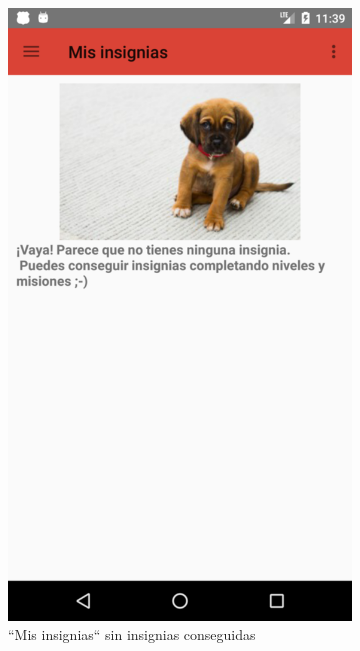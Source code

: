 \documentclass[twoside]{report}
\begin{document}
\begin{figure}[H]
\begin{center}
	\begin{subfigure}[t]{.3\linewidth}
		\includegraphics[scale=0.2]{images/userguide/7.png}
		\caption{“Mis insignias“ sin insignias conseguidas}
	\end{subfigure}\hspace{5mm}%
	\begin{subfigure}[t]{.3\linewidth}

\end{subfigure}
\end{center}
\end{figure}
\end{document}
